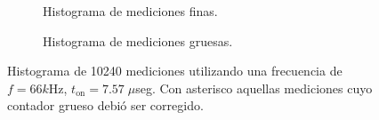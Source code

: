 \begin{figure}[H]
     \centering
     \begin{subfigure}[t]{0.45\textwidth} %
           \centering
           \caption{Histograma de mediciones finas.}
           \label{fig: histograma_66}
     \end{subfigure}%
     \hspace{10pt}%
     \begin{subfigure}[t]{0.4\textwidth} %
           \centering
           \caption{Histograma de mediciones gruesas.}
     \end{subfigure}
     \caption{Histograma de 10240 mediciones utilizando una frecuencia de $f=66k$Hz, $t_{\text{on}}=7.57 \; \mu$seg. 
     Con asterisco aquellas mediciones cuyo contador grueso debió ser corregido.}
\end{figure}

